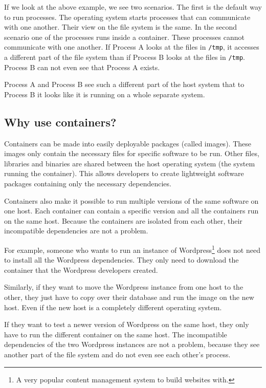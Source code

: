 If we look at the above example, we see two scenarios. The first is the default way to run processes. The operating system starts processes that can communicate with one another. Their view on the file system is the same.
In the second scenario one of the processes runs inside a container. These processes cannot communicate with one another. If Process A looks at the files in \lstinline{/tmp}, it accesses a different part of the file system than if Process B looks at the files in \lstinline{/tmp}. Process B can not even see that Process A exists.

\hfill

Process A and Process B see such a different part of the host system that to Process B it looks like it is running on a whole separate system.

\pagebreak

\subsection{Why use containers?}

Containers can be made into easily deployable packages (called images). These images only contain the necessary files for specific software to be run. Other files, libraries and binaries are shared between the host operating system (the system running the container). This allows developers to create lightweight software packages containing only the necessary dependencies.

\hfill

Containers also make it possible to run multiple versions of the same software on one host. Each container can contain a specific version and all the containers run on the same host. Because the containers are isolated from each other, their incompatible dependencies are not a problem.

\hfill

For example, someone who wants to run an instance of Wordpress\footnote{A very popular content management system to build websites with.} does not need to install all the Wordpress dependencies. They only need to download the container that the Wordpress developers created.

Similarly, if they want to move the Wordpress instance from one host to the other, they just have to copy over their database and run the image on the new host. Even if the new host is a completely different operating system.

If they want to test a newer version of Wordpress on the same host, they only have to run the different container on the same host. The incompatible dependencies of the two Wordpress instances are not a problem, because they see another part of the file system and do not even see each other's process.

